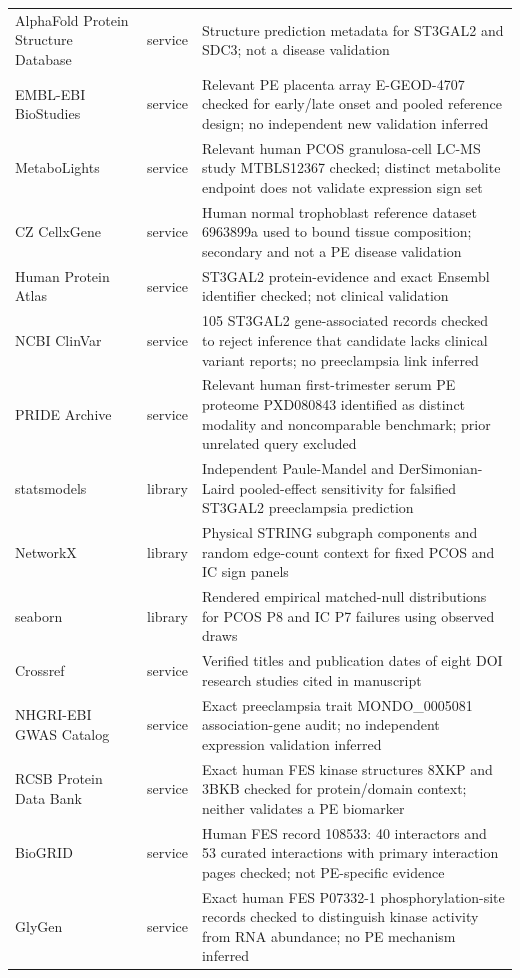 \begin{longtable}{p{3.4cm}p{1.1cm}p{8.6cm}}
AlphaFold Protein Structure Database & service & Structure prediction metadata for ST3GAL2 and SDC3; not a disease validation\\
EMBL-EBI BioStudies & service & Relevant PE placenta array E-GEOD-4707 checked for early/late onset and pooled reference design; no independent new validation inferred\\
MetaboLights & service & Relevant human PCOS granulosa-cell LC-MS study MTBLS12367 checked; distinct metabolite endpoint does not validate expression sign set\\
CZ CellxGene & service & Human normal trophoblast reference dataset 6963899a used to bound tissue composition; secondary and not a PE disease validation\\
Human Protein Atlas & service & ST3GAL2 protein-evidence and exact Ensembl identifier checked; not clinical validation\\
NCBI ClinVar & service & 105 ST3GAL2 gene-associated records checked to reject inference that candidate lacks clinical variant reports; no preeclampsia link inferred\\
PRIDE Archive & service & Relevant human first-trimester serum PE proteome PXD080843 identified as distinct modality and noncomparable benchmark; prior unrelated query excluded\\
statsmodels & library & Independent Paule-Mandel and DerSimonian-Laird pooled-effect sensitivity for falsified ST3GAL2 preeclampsia prediction\\
NetworkX & library & Physical STRING subgraph components and random edge-count context for fixed PCOS and IC sign panels\\
seaborn & library & Rendered empirical matched-null distributions for PCOS P8 and IC P7 failures using observed draws\\
Crossref & service & Verified titles and publication dates of eight DOI research studies cited in manuscript\\
NHGRI-EBI GWAS Catalog & service & Exact preeclampsia trait MONDO\_0005081 association-gene audit; no independent expression validation inferred\\
RCSB Protein Data Bank & service & Exact human FES kinase structures 8XKP and 3BKB checked for protein/domain context; neither validates a PE biomarker\\
BioGRID & service & Human FES record 108533: 40 interactors and 53 curated interactions with primary interaction pages checked; not PE-specific evidence\\
GlyGen & service & Exact human FES P07332-1 phosphorylation-site records checked to distinguish kinase activity from RNA abundance; no PE mechanism inferred\\

\end{longtable}
